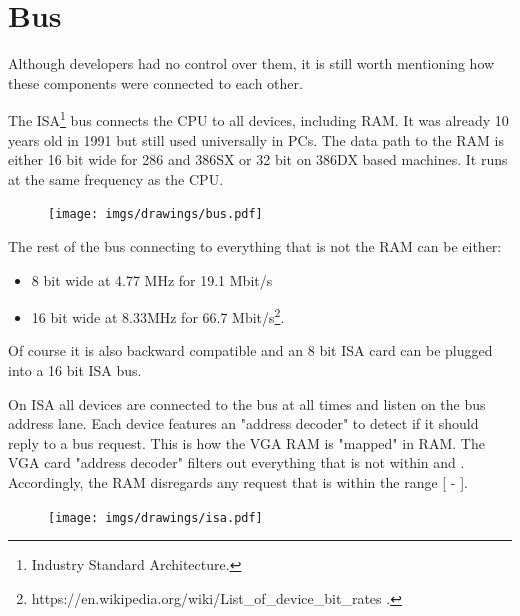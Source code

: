 \documentclass[book.tex]{subfiles}
\begin{document}
\section{Bus}
Although developers had no control over them, it is still worth mentioning how these components were connected to each other.\\ 
\par

The ISA\footnote{Industry Standard Architecture.} bus connects the CPU to all devices, including RAM. It was already 10 years old in 1991 but still used universally in PCs. The data path to the RAM is either 16 bit wide for 286 and 386SX or 32 bit on 386DX based machines. It runs at the same frequency as the CPU.\\
\par

\begin{figure}[H]
\centering
      \texttt{[image: imgs/drawings/bus.pdf]}
\end{figure}
\pagebreak
The rest of the bus connecting to everything that is not the RAM can be either:
\begin{itemize}
\item 8 bit wide at 4.77 MHz  for 19.1 Mbit/s
\item 16 bit wide at 8.33MHz for 66.7 Mbit/s\footnote{https://en.wikipedia.org/wiki/List\_of\_device\_bit\_rates .}.
\end{itemize}
Of course it is also backward compatible and an 8 bit ISA card can be plugged into a 16 bit ISA bus.\\
\par
\par
{} On ISA all devices are connected to the bus at all times and listen on the bus address lane. Each device features an "address decoder" to detect if it should reply to a bus request. This is how the VGA RAM is "mapped" in RAM. The VGA card "address decoder"  filters out everything that is not within  and . Accordingly, the RAM disregards any request that is within the range [ - ].\\
\par
 \begin{figure}[H]
\centering
\texttt{[image: imgs/drawings/isa.pdf]}
\end{figure}
\end{document}
